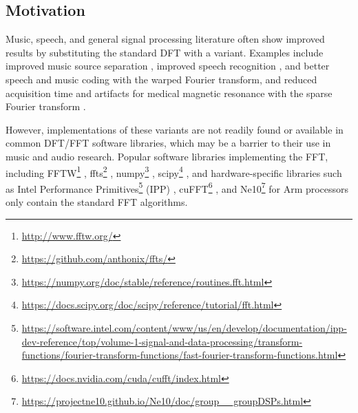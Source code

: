 \documentclass[letter,12pt,notitlepage]{article}
\begin{document}
\subsection{Motivation}

Music, speech, and general signal processing literature often show improved results by substituting the standard DFT with a variant. Examples include improved music source separation \cite{betterbss}, improved speech recognition \cite{bettermfcc}, and better speech and music coding \cite{warpedcomparison} with the warped Fourier transform, and reduced acquisition time and artifacts for medical magnetic resonance with the sparse Fourier transform \cite{bettersparse}.

However, implementations of these variants are not readily found or available in common DFT/FFT software libraries, which may be a barrier to their use in music and audio research. Popular software libraries implementing the FFT, including FFTW\footnote{\href{http://www.fftw.org/}{http://www.fftw.org/}} \cite{fftw1}, ffts\footnote{\href{https://github.com/anthonix/ffts/}{https://github.com/anthonix/ffts/}} \cite{ffts}, numpy\footnote{\href{https://numpy.org/doc/stable/reference/routines.fft.html}{https://numpy.org/doc/stable/reference/routines.fft.html}} \cite{numpy}, scipy\footnote{\href{https://docs.scipy.org/doc/scipy/reference/tutorial/fft.html}{https://docs.scipy.org/doc/scipy/reference/tutorial/fft.html}} \cite{scipy}, and hardware-specific libraries such as Intel Performance Primitives\footnote{\href{https://software.intel.com/content/www/us/en/develop/documentation/ipp-dev-reference/top/volume-1-signal-and-data-processing/transform-functions/fourier-transform-functions/fast-fourier-transform-functions.html}{https://software.intel.com/content/www/us/en/develop/documentation/ipp-dev-reference/top/volume-1-signal-and-data-processing/transform-functions/fourier-transform-functions/fast-fourier-transform-functions.html}} (IPP) \cite{ipp}, cuFFT\footnote{\href{https://docs.nvidia.com/cuda/cufft/index.html}{https://docs.nvidia.com/cuda/cufft/index.html}} \cite{cufft}, and Ne10\footnote{\href{https://projectne10.github.io/Ne10/doc/group__groupDSPs.html}{https://projectne10.github.io/Ne10/doc/group\_\_groupDSPs.html}} for Arm processors \cite{ne10} only contain the standard FFT algorithms.
\end{document}
